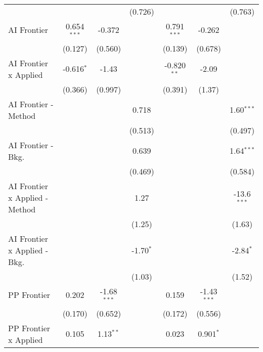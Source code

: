 \begin{tabular}{lcccccc}
                                  &               &               & (0.726)       &               &               & (0.763)\\   
   AI Frontier                    & 0.654$^{***}$ & -0.372        &               & 0.791$^{***}$ & -0.262        &   \\   
                                  & (0.127)       & (0.560)       &               & (0.139)       & (0.678)       &   \\   
   AI Frontier x Applied          & -0.616$^{*}$  & -1.43         &               & -0.820$^{**}$ & -2.09         &   \\   
                                  & (0.366)       & (0.997)       &               & (0.391)       & (1.37)        &   \\   
   AI Frontier - Method           &               &               & 0.718         &               &               & 1.60$^{***}$\\   
                                  &               &               & (0.513)       &               &               & (0.497)\\   
   AI Frontier - Bkg.             &               &               & 0.639         &               &               & 1.64$^{***}$\\   
                                  &               &               & (0.469)       &               &               & (0.584)\\   
   AI Frontier x Applied - Method &               &               & 1.27          &               &               & -13.6$^{***}$\\   
                                  &               &               & (1.25)        &               &               & (1.63)\\   
   AI Frontier x Applied - Bkg.   &               &               & -1.70$^{*}$   &               &               & -2.84$^{*}$\\   
                                  &               &               & (1.03)        &               &               & (1.52)\\   
   PP Frontier                    & 0.202         & -1.68$^{***}$ &               & 0.159         & -1.43$^{***}$ &   \\   
                                  & (0.170)       & (0.652)       &               & (0.172)       & (0.556)       &   \\   
   PP Frontier x Applied          & 0.105         & 1.13$^{**}$   &               & 0.023         & 0.901$^{*}$   &   \\   

\end{tabular}
